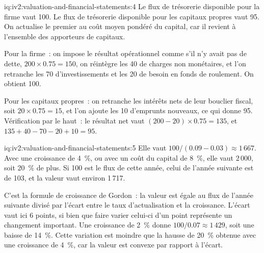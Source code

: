 \begin{solution}{iq:iv2:valuation-and-financial-statements:4}
Le flux de trésorerie disponible pour la firme vaut 100. Le flux de trésorerie disponible pour les capitaux propres vaut 95. On actualise le premier au coût moyen pondéré du capital, car il revient à l'ensemble des apporteurs de capitaux.

Pour la firme~: on impose le résultat opérationnel comme s'il n'y avait pas de dette, $200 \times 0.75 = 150$, on réintègre les 40 de charges non monétaires, et l'on retranche les 70 d'investissements et les 20 de besoin en fonds de roulement. On obtient 100.

Pour les capitaux propres~: on retranche les intérêts nets de leur bouclier fiscal, soit $20 \times 0.75 = 15$, et l'on ajoute les 10 d'emprunts nouveaux, ce qui donne 95. Vérification par le haut~: le résultat net vaut $(200 - 20) \times 0.75 = 135$, et $135 + 40 - 70 - 20 + 10 = 95$.

\end{solution}

\begin{solution}{iq:iv2:valuation-and-financial-statements:5}
Elle vaut $100/(0.09 - 0.03) \approx 1\,667$. Avec une croissance de 4~\%, ou avec un coût du capital de 8~\%, elle vaut 2\,000, soit 20~\% de plus. Si 100 est le flux de cette année, celui de l'année suivante est de 103, et la valeur vaut environ 1\,717.

C'est la formule de croissance de Gordon~: la valeur est égale au flux de l'année suivante divisé par l'écart entre le taux d'actualisation et la croissance. L'écart vaut ici 6 points, si bien que faire varier celui-ci d'un point représente un changement important. Une croissance de 2~\% donne $100/0.07 \approx 1\,429$, soit une baisse de 14~\%. Cette variation est moindre que la hausse de 20~\% obtenue avec une croissance de 4~\%, car la valeur est convexe par rapport à l'écart.

\end{solution}

